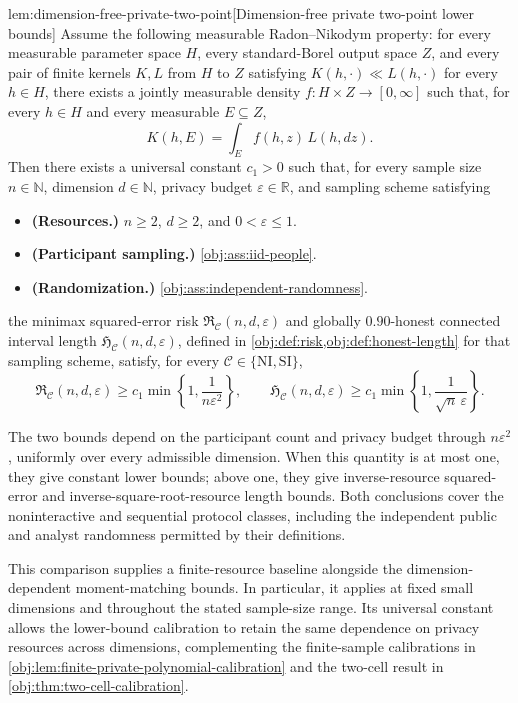 \begin{lemmav}{lem:dimension-free-private-two-point}[Dimension-free private two-point lower bounds]
Assume the following measurable Radon--Nikodym property: for every measurable parameter space \(H\), every standard-Borel output space \(Z\), and every pair of finite kernels \(K,L\) from \(H\) to \(Z\) satisfying \(K(h,\cdot)\ll L(h,\cdot)\) for every \(h\in H\), there exists a jointly measurable density \(f:H\times Z\to[0,\infty]\) such that, for every \(h\in H\) and every measurable \(E\subseteq Z\),
\[
K(h,E)=\int_E f(h,z)\,L(h,dz).
\]
Then there exists a universal constant \(c_1>0\) such that, for every sample size \(n\in\mathbb N\), dimension \(d\in\mathbb N\), privacy budget \(\varepsilon\in\mathbb R\), and sampling scheme satisfying
\begin{itemize}
\item \textbf{(Resources.)} \(n\ge2\), \(d\ge2\), and \(0<\varepsilon\le1\).
\item \textbf{(Participant sampling.)} \cref{obj:ass:iid-people}.
\item \textbf{(Randomization.)} \cref{obj:ass:independent-randomness}.
\end{itemize}
the minimax squared-error risk \(\mathfrak R_{\mathcal C}(n,d,\varepsilon)\) and globally \(0.90\)-honest connected interval length \(\mathfrak H_{\mathcal C}(n,d,\varepsilon)\), defined in \cref{obj:def:risk,obj:def:honest-length} for that sampling scheme, satisfy, for every \(\mathcal C\in\{\mathrm{NI},\mathrm{SI}\}\),
\[
\mathfrak R_{\mathcal C}(n,d,\varepsilon)
\ge c_1\min\left\{1,\frac{1}{n\varepsilon^2}\right\},
\qquad
\mathfrak H_{\mathcal C}(n,d,\varepsilon)
\ge c_1\min\left\{1,\frac{1}{\sqrt n\,\varepsilon}\right\}.
\]
\end{lemmav}

The two bounds depend on the participant count and privacy budget through \(n\varepsilon^2\), uniformly over every admissible dimension. When this quantity is at most one, they give constant lower bounds; above one, they give inverse-resource squared-error and inverse-square-root-resource length bounds. Both conclusions cover the noninteractive and sequential protocol classes, including the independent public and analyst randomness permitted by their definitions.

This comparison supplies a finite-resource baseline alongside the dimension-dependent moment-matching bounds. In particular, it applies at fixed small dimensions and throughout the stated sample-size range. Its universal constant allows the lower-bound calibration to retain the same dependence on privacy resources across dimensions, complementing the finite-sample calibrations in \cref{obj:lem:finite-private-polynomial-calibration} and the two-cell result in \cref{obj:thm:two-cell-calibration}.
